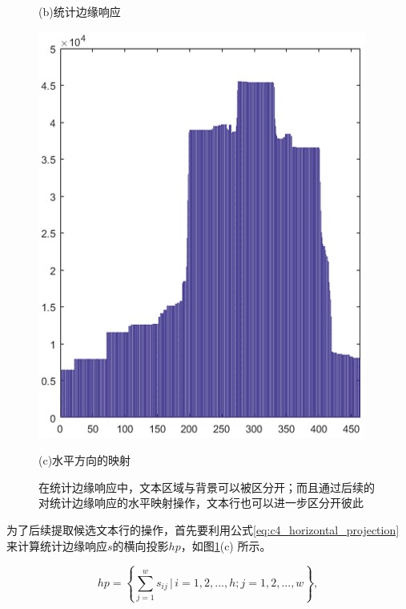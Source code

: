 \begin{figure}[htbp]
\begin{minipage}[t]{0.35\linewidth}
        \centerline{\small (b)统计边缘响应}
        \end{minipage}
        \begin{minipage}[t]{0.25\linewidth}
        \centering
        \includegraphics[width=\textwidth]{./figures/c4_horizontal_projection.jpg}
        \centerline{\small (c)水平方向的映射}
        \end{minipage}
        \caption{在统计边缘响应中，文本区域与背景可以被区分开；而且通过后续的对统计边缘响应的水平映射操作，文本行也可以进一步区分开彼此}
        \label{fig.c4_static_skeleton_response}
        \end{figure}

        为了后续提取候选文本行的操作，首先要利用公式\ref{eq:c4_horizontal_projection} 来计算统计边缘响应$s$的横向投影$hp$，如图\ref{fig.c4_static_skeleton_response}(c) 所示。

        \begin{equation}
        hp= \left\{ \sum_{j=1}^w s_{ij} \, | \, i=1,2,...,h;j=1,2,...,w \right\},
        \label{eq:c4_horizontal_projection}
        \end{equation}


